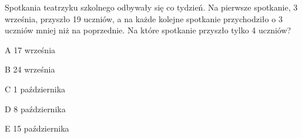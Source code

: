 \begin{tresc}
Spotkania teatrzyku szkolnego odbywały się co tydzień. Na pierwsze spotkanie, 3 września, przyszło 19 uczniów, a na każde kolejne spotkanie przychodziło o 3 uczniów mniej niż na poprzednie. Na które spotkanie przyszło tylko 4 uczniów?
\end{tresc}
\begin{wariant}{A} 17 września \end{wariant}
\begin{wariant}{B} 24 września \end{wariant}
\begin{wariant}{C} 1 października \end{wariant}
\begin{wariant}{D} 8 października \end{wariant}
\begin{wariant}{E} 15 października \end{wariant}
